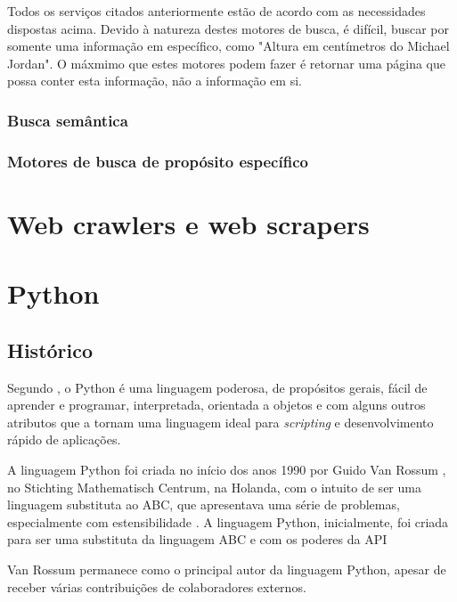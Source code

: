Todos os serviços citados anteriormente estão de acordo com as necessidades dispostas acima. Devido à natureza destes motores de busca, é difícil, buscar por somente uma informação em específico, como "Altura em centímetros do Michael Jordan". O máxmimo que estes motores podem fazer é retornar uma página que possa conter esta informação, não a informação em si.

\subsubsection{Busca semântica}

\subsubsection{Motores de busca de propósito específico}

\pagebreak
\section{Web crawlers e web scrapers}

\pagebreak
\section{Python}

\subsection{Histórico}
Segundo \cite{pythondoc}, o Python é uma linguagem poderosa, de propósitos gerais, fácil de aprender e programar, interpretada, orientada a objetos e com alguns outros atributos que a tornam uma linguagem ideal para \emph{scripting} e desenvolvimento rápido de aplicações.

A linguagem Python foi criada no início dos anos 1990 por Guido Van Rossum \cite{pythonlicense}, no Stichting Mathematisch Centrum, na Holanda, com o intuito de ser uma linguagem substituta ao ABC, que apresentava uma série de problemas, especialmente com estensibilidade \cite{pythonfaq}. A linguagem Python, inicialmente, foi criada para ser uma substituta da linguagem ABC e com os poderes da API 

Van Rossum permanece como o principal autor da linguagem Python, apesar de receber várias contribuições de colaboradores externos.

